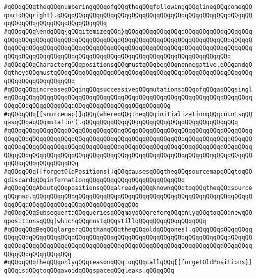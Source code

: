 \verb|#qQQqqQQqtheqQQqnumberingqQQqofqQQqtheqQQqfollowingqQQqlineqQQqcomeqQQqoutqQQqright).qQQqqQQqqQQqqQQqqQQqqQQqqQQqqQQqqQQqqQQqqQQqqQQqqQQqqQQqqQQqqQQqqQQqqQQqqQQqqQQqqQQq|\newline
\verb|#qQQqqQQq\endqQQq{qQQqitemizeqQQq}qQQqqQQqqQQqqQQqqQQqqQQqqQQqqQQqqQQqqQQqqQQqqQQqqQQqqQQqqQQqqQQqqQQqqQQqqQQqqQQqqQQqqQQqqQQqqQQqqQQqqQQqqQQqqQQqqQQqqQQqqQQqqQQqqQQqqQQqqQQqqQQqqQQqqQQqqQQqqQQqqQQqqQQqqQQqqQQqqQQqqQQqqQQqqQQqqQQqqQQqqQQqqQQqqQQqqQQqqQQqqQQqqQQqqQQqqQQqqQQq|\newline
\verb|#qQQqqQQqCharacterqQQqpositionsqQQqmustqQQqbeqQQqnonnegative,qQQqandqQQqtheyqQQqmustqQQqqQQqqQQqqQQqqQQqqQQqqQQqqQQqqQQqqQQqqQQqqQQqqQQqqQQqqQQqqQQqqQQqqQQqqQQq|\newline
\verb|#qQQqqQQqincreaseqQQqinqQQqsuccessiveqQQqmutationsqQQqofqQQqaqQQqsingleqQQqqQQqqQQqqQQqqQQqqQQqqQQqqQQqqQQqqQQqqQQqqQQqqQQqqQQqqQQqqQQqqQQqqQQqqQQqqQQqqQQqqQQqqQQqqQQqqQQqqQQqqQQqqQQqqQQq|\newline
\verb|#qQQqqQQq[[sourcemap]]qQQq(whereqQQqtheqQQqinitializationqQQqcountsqQQqasqQQqaqQQqmutation).qQQqqQQqqQQqqQQqqQQqqQQqqQQqqQQqqQQqqQQqqQQq|\newline
\verb|#qQQqqQQqqQQqqQQqqQQqqQQqqQQqqQQqqQQqqQQqqQQqqQQqqQQqqQQqqQQqqQQqqQQqqQQqqQQqqQQqqQQqqQQqqQQqqQQqqQQqqQQqqQQqqQQqqQQqqQQqqQQqqQQqqQQqqQQqqQQqqQQqqQQqqQQqqQQqqQQqqQQqqQQqqQQqqQQqqQQqqQQqqQQqqQQqqQQqqQQqqQQqqQQqqQQqqQQqqQQqqQQqqQQqqQQqqQQqqQQqqQQqqQQqqQQqqQQqqQQqqQQqqQQqqQQqqQQqqQQqqQQqqQQqqQQqqQQqqQQq|\newline
\verb|#qQQqqQQq[[forgetOldPositions]]qQQqcausesqQQqtheqQQqsourcemapqQQqtoqQQqdiscardqQQqinformationqQQqqQQqqQQqqQQqqQQqqQQqqQQq|\newline
\verb|#qQQqqQQqAboutqQQqpositionsqQQqalreadyqQQqknownqQQqtoqQQqtheqQQqsourceqQQqmap.qQQqqQQqqQQqqQQqqQQqqQQqqQQqqQQqqQQqqQQqqQQqqQQqqQQqqQQqqQQqqQQqqQQqqQQqqQQqqQQqqQQqqQQqqQQqqQQqqQQq|\newline
\verb|#qQQqqQQqSubsequentqQQqqueriesqQQqmayqQQqreferqQQqonlyqQQqtoqQQqnewqQQqpositionsqQQq(whichqQQqmustqQQqstillqQQqqQQqqQQqqQQqqQQq|\newline
\verb|#qQQqqQQqBeqQQqlargerqQQqthanqQQqtheqQQqoldqQQqones).qQQqqQQqqQQqqQQqqQQqqQQqqQQqqQQqqQQqqQQqqQQqqQQqqQQqqQQqqQQqqQQqqQQqqQQqqQQqqQQqqQQqqQQqqQQqqQQqqQQqqQQqqQQqqQQqqQQqqQQqqQQqqQQqqQQqqQQqqQQqqQQqqQQqqQQqqQQqqQQqqQQqqQQqqQQqqQQq|\newline
\verb|#qQQqqQQqTheqQQqonlyqQQqreasonqQQqtoqQQqcallqQQq[[forgetOldPositions]]qQQqisqQQqtoqQQqavoidqQQqspaceqQQqleaks.qQQqqQQq|\newline
